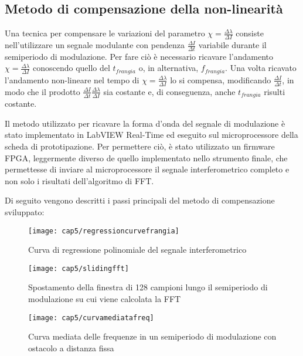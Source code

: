 \subsection{Metodo di compensazione della non-linearità}
Una tecnica per compensare le variazioni del parametro $\chi = \frac{\Delta \lambda}{\Delta I}$ consiste nell'utilizzare un segnale modulante con pendenza $\frac{\Delta I}{\Delta t}$ variabile durante il semiperiodo di modulazione. Per fare ciò è necessario ricavare l'andamento $\chi = \frac{\Delta \lambda}{\Delta I}$ conoscendo quello del $t_{frangia}$ o, in alternativa, $f_{frangia}$. Una volta ricavato l'andamento non-lineare nel tempo di $\chi = \frac{\Delta \lambda}{\Delta I}$ lo si compensa, modificando $\frac{\Delta I}{\Delta t}$, in modo che il prodotto $\frac{\Delta I}{\Delta t} \frac{\Delta \lambda}{\Delta I}$ sia costante e, di conseguenza, anche $t_{frangia}$ risulti costante.

Il metodo utilizzato per ricavare la forma d'onda del segnale di modulazione è stato implementato in LabVIEW Real-Time ed eseguito sul microprocessore della scheda di prototipazione. Per permettere ciò, è stato utilizzato un firmware FPGA, leggermente diverso de quello implementato nello strumento finale, che permettesse di inviare al microprocessore il segnale interferometrico completo e non solo i risultati dell'algoritmo di FFT.

Di seguito vengono descritti i passi principali del metodo di compensazione sviluppato:
\begin{figure}  
  \begin{center}
    \texttt{[image: cap5/regressioncurvefrangia]}
    \caption{Curva di regressione polinomiale del segnale interferometrico}
    \label{regressioncurvefrangia}
  \end{center}
\end{figure}

\begin{figure}  
  \begin{center}
    \texttt{[image: cap5/slidingfft]}
    \caption{Spostamento della finestra di 128 campioni lungo il semiperiodo di modulazione su cui viene calcolata la FFT}
    \label{slidingfft}
  \end{center}
\end{figure}

\begin{figure}  
  \begin{center}
    \texttt{[image: cap5/curvamediatafreq]}
    \caption{Curva mediata delle frequenze in un semiperiodo di modulazione con ostacolo a distanza fissa}
    \label{curvamediatafreq}
  \end{center}
\end{figure}

